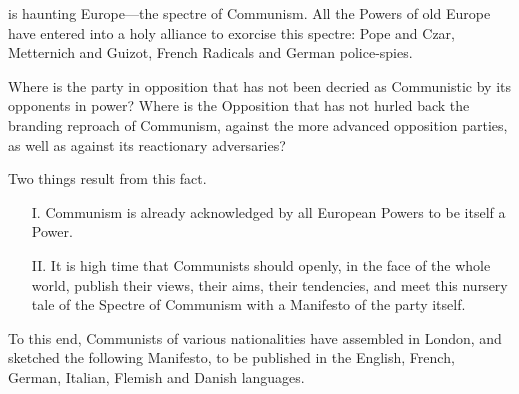 

 is haunting Europe—the spectre of Communism. All the Powers
of old Europe have entered into a holy alliance to exorcise this
spectre: Pope and Czar, Metternich and Guizot, French Radicals and
German police-spies.

Where is the party in opposition that has not been decried as
Communistic by its opponents in power? Where is the Opposition that has
not hurled back the branding reproach of Communism, against the more
advanced opposition parties, as well as against its reactionary
adversaries?

Two things result from this fact.

\begin{enumerate}
\item[I.] Communism is already acknowledged by all European Powers to be
itself a Power.
\item[II.] It is high time that Communists should openly, in the face of the
whole world, publish their views, their aims, their tendencies, and
meet this nursery tale of the Spectre of Communism with a Manifesto of
the party itself.
\end{enumerate}



To this end, Communists of various nationalities have assembled in
London, and sketched the following Manifesto, to be published in the
English, French, German, Italian, Flemish and Danish languages.


